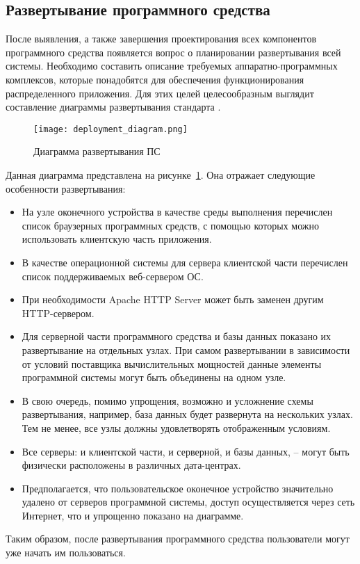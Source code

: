 \subsection{Развертывание программного средства}
\label{sec:design:deployment}

После выявления, а также завершения проектирования всех компонентов программного средства появляется вопрос о планировании развертывания всей системы. Необходимо составить описание требуемых аппаратно-программных комплексов, которые понадобятся для обеспечения функционирования распределенного приложения. Для этих целей целесообразным выглядит составление диаграммы развертывания стандарта \uml. 

\begin{figure}[H]
\centering
	\texttt{[image: deployment\_diagram.png]}
	\caption{Диаграмма развертывания ПС}
	\label{fig:design:deployment:diagram}
\end{figure}

Данная диаграмма представлена на рисунке~\ref{fig:design:deployment:diagram}. Она отражает следующие особенности развертывания:

\begin{itemize}
	\item На узле оконечного устройства в качестве среды выполнения перечислен список браузерных программных средств, с помощью которых можно использовать клиентскую часть приложения.
	\item В качестве операционной системы для сервера клиентской части перечислен список поддерживаемых веб-сервером ОС.
	\item При необходимости Apache HTTP Server может быть заменен другим HTTP-сервером.
	\item Для серверной части программного средства и базы данных показано их развертывание на отдельных узлах. При самом развертывании в зависимости от условий поставщика вычислительных мощностей данные элементы программной системы могут быть объединены на одном узле.
	\item В свою очередь, помимо упрощения, возможно и усложнение схемы развертывания, например, база данных будет развернута на нескольких узлах. Тем не менее, все узлы должны удовлетворять отображенным условиям.
	\item Все серверы: и клиентской части, и серверной, и базы данных, -- могут быть физически расположены в различных дата-центрах.
	\item Предполагается, что пользовательское оконечное устройство зна\-чи\-те\-льно удалено от серверов программной системы, доступ осуществляется через сеть Интернет, что и упрощенно показано на диаграмме.
\end{itemize}

Таким образом, после развертывания программного средства пользователи могут уже начать им пользоваться.
